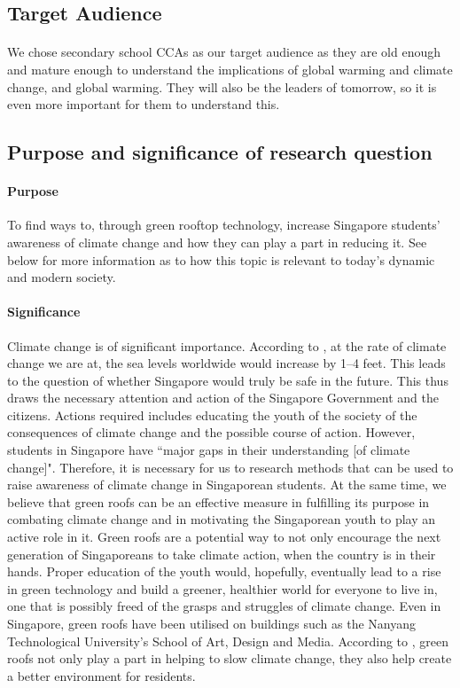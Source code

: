 \documentclass{article}
\begin{document}
\begin{multicols}{2}
  \subsection{Target Audience}
  \paragraph{} We chose secondary school CCAs as our target audience as
  they are old enough and mature enough to understand the implications
  of global warming and climate change, and global warming. They will
  also be the leaders of tomorrow, so it is even more important for them
  to understand this.


  \subsection{Purpose and significance of research question}
  \paragraph{Purpose} To find ways to, through green rooftop technology,
  increase Singapore students' awareness of climate change and how they
  can play a part in reducing it. See below for more information as to
  how this topic is relevant to today's dynamic and modern society.

  \paragraph{Significance} Climate change is of significant
  importance. According to , at the rate of climate
  change we are at, the sea levels worldwide would increase by 1--4
  feet. This leads to the question of whether Singapore would truly
  be safe in the future. This thus draws the necessary attention and
  action of the Singapore Government and the citizens. Actions required
  includes educating the youth of the society of the consequences of
  climate change and the possible course of action.  However, students
  in Singapore have ``major gaps in their understanding [of climate
  change]"\cite{student_carbon_footprint}. Therefore, it is necessary
  for us to research methods that can be used to raise awareness of
  climate change in Singaporean students. At the same time, we believe
  that green roofs can be an effective measure in fulfilling its purpose
  in combating climate change and in motivating the Singaporean youth
  to play an active role in it. Green roofs are a potential way to not
  only encourage the next generation of Singaporeans to take climate
  action,  when the country is in their hands. Proper education of the
  youth would, hopefully, eventually lead to a rise in green technology
  and build a greener, healthier world for everyone to live in, one that
  is possibly freed of the grasps and struggles of climate change. Even
  in Singapore, green roofs have been utilised on buildings such as
  the Nanyang Technological University’s School of Art, Design and
  Media. According to , green roofs not only
  play a part in helping to slow climate change, they also help create
  a better environment for residents.



\end{multicols}
\end{document}
